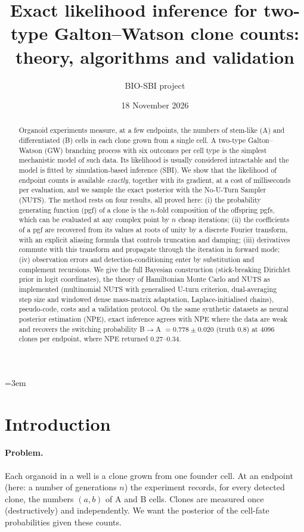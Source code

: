 \documentclass[11pt]{article}
\title{Exact likelihood inference for two-type Galton--Watson clone counts:\\ theory, algorithms and validation}
\author{BIO-SBI project}
\date{18 November 2026}
\theoremstyle{definition}
\theoremstyle{remark}
\begin{document}
\sloppy\emergencystretch=3em
\maketitle

\begin{abstract}
Organoid experiments measure, at a few endpoints, the numbers of stem-like (A) and differentiated (B) cells in each clone grown from a single cell. A two-type Galton--Watson (GW) branching process with six outcomes per cell type is the simplest mechanistic model of such data. Its likelihood is usually considered intractable and the model is fitted by simulation-based inference (SBI). We show that the likelihood of endpoint counts is available \emph{exactly}, together with its gradient, at a cost of milliseconds per evaluation, and we sample the exact posterior with the No-U-Turn Sampler (NUTS). The method rests on four results, all proved here: (i) the probability generating function (pgf) of a clone is the $n$-fold composition of the offspring pgfs, which can be evaluated at any complex point by $n$ cheap iterations; (ii) the coefficients of a pgf are recovered from its values at roots of unity by a discrete Fourier transform, with an explicit aliasing formula that controls truncation and damping; (iii) derivatives commute with this transform and propagate through the iteration in forward mode; (iv) observation errors and detection-conditioning enter by substitution and complement recursions. We give the full Bayesian construction (stick-breaking Dirichlet prior in logit coordinates), the theory of Hamiltonian Monte Carlo and NUTS as implemented (multinomial NUTS with generalised U-turn criterion, dual-averaging step size and windowed dense mass-matrix adaptation, Laplace-initialised chains), pseudo-code, costs and a validation protocol. On the same synthetic datasets as neural posterior estimation (NPE), exact inference agrees with NPE where the data are weak and recovers the switching probability B$\to$A $=0.778\pm0.020$ (truth 0.8) at 4096 clones per endpoint, where NPE returned 0.27--0.34.
\end{abstract}

\tableofcontents

\section{Introduction}\label{sec:intro}
\paragraph{Problem.} Each organoid in a well is a clone grown from one founder cell. At an endpoint (here: a number of generations $n$) the experiment records, for every detected clone, the numbers $(a,b)$ of A and B cells. Clones are measured once (destructively) and independently. We want the posterior of the cell-fate probabilities given these counts.
\end{document}
